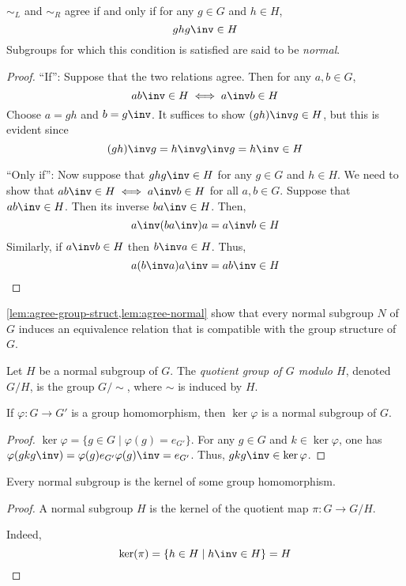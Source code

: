 \documentclass{amsart}
\begin{document}
\begin{lem}\label{lem:agree-normal}
  $\sim_{L}$ and $\sim_{R}$ agree if and only if for any $g \in G$ and $h \in H$,
  \[
    ghg\inv \in H
  \]
  Subgroups for which this condition is satisfied are said to be \emph{normal}.
\end{lem}
\begin{proof}
  ``If'': Suppose that the two relations agree.
  Then for any $a,b \in G$,
  \[
    ab\inv \in H \iff a\inv b \in H
  \]
  Choose $a = gh$ and $b = g\inv$.
  It suffices to show $(gh)\inv g \in H$, but this is evident since
  \[
    (gh)\inv g = h\inv g\inv g = h\inv \in H
  \]

  ``Only if'': Now suppose that $ghg\inv \in H$ for any $g \in G$ and $h \in H$.
  We need to show that $ab\inv \in H \iff a\inv b \in H$ for all $a, b \in G$.
  Suppose that $ab\inv \in H$.
  Then its inverse $ba\inv \in H$.
  Then,
  \[
    a\inv(ba\inv)a = a\inv b \in H
  \]
  Similarly, if $a\inv b \in H$ then $b\inv a \in H$.
  Thus,
  \[
    a(b\inv a)a\inv = ab\inv \in H
  \]
\end{proof}

\cref{lem:agree-group-struct,lem:agree-normal} show that every normal subgroup $N$ of $G$ induces an equivalence relation that is compatible with the group structure of $G$.

\begin{defn}
  Let $H$ be a normal subgroup of $G$.
  The \emph{quotient group of $G$ modulo $H$}, denoted $G/H$, is the group $G/\sim$, where $\sim$ is induced by $H$.
\end{defn}

\begin{lem}
  If $\varphi : G \to G'$ is a group homomorphism, then $\ker{\varphi}$ is a normal subgroup of $G$.
\end{lem}
\begin{proof}
  $\ker{\varphi} = \{g \in G \mid \varphi(g) = e_{G'}\}$.
  For any $g \in G$ and $k \in \ker{\varphi}$, one has $\varphi(gkg\inv) = \varphi(g)e_{G'}\varphi(g)\inv = e_{G'}$.
  Thus, $gkg\inv \in \ker{\varphi}$.
\end{proof}

\begin{lem}
  Every normal subgroup is the kernel of some group homomorphism.
\end{lem}
\begin{proof}
  A normal subgroup $H$ is the kernel of the quotient map $\pi : G \to G/H$.
  
  Indeed,
  \[
    \ker(\pi) = \{h \in H \mid h\inv \in H\} = H
  \]
\end{proof}
\end{document}
